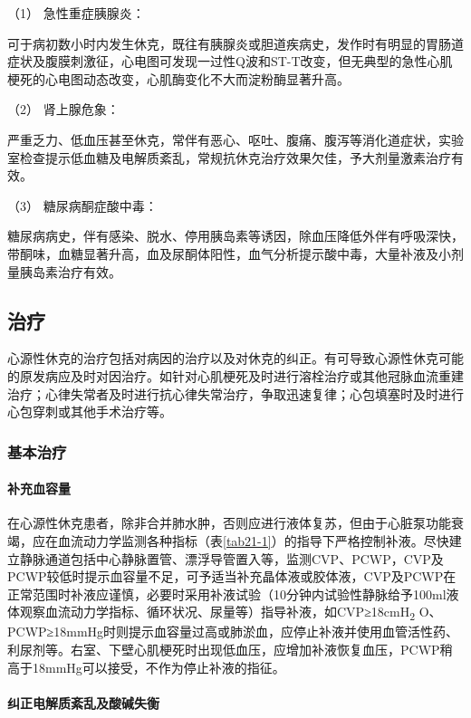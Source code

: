 \hypertarget{text00059.htmlux5cux23CHP2-3-2-4-2-1}{}
（1） 急性重症胰腺炎：

可于病初数小时内发生休克，既往有胰腺炎或胆道疾病史，发作时有明显的胃肠道症状及腹膜刺激征，心电图可发现一过性Q波和ST-T改变，但无典型的急性心肌梗死的心电图动态改变，心肌酶变化不大而淀粉酶显著升高。

\hypertarget{text00059.htmlux5cux23CHP2-3-2-4-2-2}{}
（2） 肾上腺危象：

严重乏力、低血压甚至休克，常伴有恶心、呕吐、腹痛、腹泻等消化道症状，实验室检查提示低血糖及电解质紊乱，常规抗休克治疗效果欠佳，予大剂量激素治疗有效。

\hypertarget{text00059.htmlux5cux23CHP2-3-2-4-2-3}{}
（3） 糖尿病酮症酸中毒：

糖尿病病史，伴有感染、脱水、停用胰岛素等诱因，除血压降低外伴有呼吸深快，带酮味，血糖显著升高，血及尿酮体阳性，血气分析提示酸中毒，大量补液及小剂量胰岛素治疗有效。

\subsection{治疗}

心源性休克的治疗包括对病因的治疗以及对休克的纠正。有可导致心源性休克可能的原发病应及时对因治疗。如针对心肌梗死及时进行溶栓治疗或其他冠脉血流重建治疗；心律失常者及时进行抗心律失常治疗，争取迅速复律；心包填塞时及时进行心包穿刺或其他手术治疗等。

\subsubsection{基本治疗}

\paragraph{补充血容量}

在心源性休克患者，除非合并肺水肿，否则应进行液体复苏，但由于心脏泵功能衰竭，应在血流动力学监测各种指标（表\ref{tab21-1}）的指导下严格控制补液。尽快建立静脉通道包括中心静脉置管、漂浮导管置入等，监测CVP、PCWP，CVP及PCWP较低时提示血容量不足，可予适当补充晶体液或胶体液，CVP及PCWP在正常范围时补液应谨慎，必要时采用补液试验（10分钟内试验性静脉给予100ml液体观察血流动力学指标、循环状况、尿量等）指导补液，如CVP≥18cmH\textsubscript{2}
O、PCWP≥18mmHg时则提示血容量过高或肺淤血，应停止补液并使用血管活性药、利尿剂等。右室、下壁心肌梗死时出现低血压，应增加补液恢复血压，PCWP稍高于18mmHg可以接受，不作为停止补液的指征。

\paragraph{纠正电解质紊乱及酸碱失衡}

